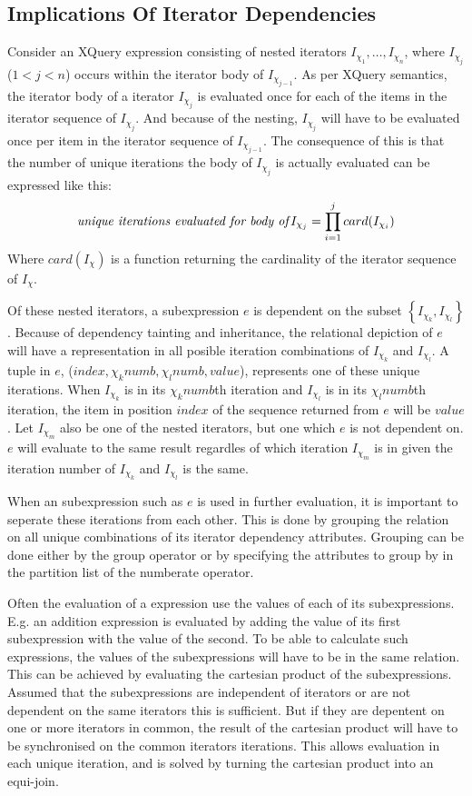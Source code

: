 \subsection{Implications Of Iterator Dependencies}
\label{sect:trans:TD:implic}
Consider an XQuery expression consisting of nested iterators $I_{\chi_1},\ldots,I_{\chi_n}$, where $I_{\chi_j}$
($1<j<n$) occurs within the iterator body of $I_{\chi_{j-1}}$. As per XQuery semantics, the iterator body of a
iterator $I_{\chi_j}$ is evaluated once for each of the items in the iterator sequence of $I_{\chi_j}$. And because
of the nesting, $I_{\chi_j}$ will have to be evaluated once per item in the iterator sequence of $I_{\chi_{j-1}}$.
The consequence of this is that the number of unique iterations the body of $I_{\chi_j}$ is actually evaluated can
be expressed like this: 
\begin{equation*}
\mbox{\textit{unique iterations evaluated for body of}}I_{\chi_j}=\displaystyle \prod_{i=1}^{j}card(I_{\chi_i})
\end{equation*}  
Where $card(I_{\chi})$ is a function returning the cardinality of the iterator sequence of $I_{\chi}$.

Of these nested iterators, a subexpression $e$ is dependent on the subset
$\left\{I_{\chi_k},I_{\chi_l}\right\}$. Because of dependency tainting and inheritance, the relational
depiction of $e$ will have a representation in all posible iteration combinations of $I_{\chi_k}$ and
$I_{\chi_l}$. A tuple in $e$, ($index, \chi_k{numb},\chi_l{numb}, value$), represents one of these unique
iterations. When $I_{\chi_k}$ is in its $\chi_k{numb}$th iteration and $I_{\chi_l}$ is in its $\chi_l{numb}$th
iteration, the item in position $index$ of the sequence returned from $e$ will be $value$. Let $I_{\chi_m}$ also
be one of the nested iterators, but one which $e$ is not dependent on. $e$ will evaluate to the same result
regardles of which iteration $I_{\chi_m}$ is in given the iteration number of $I_{\chi_k}$ and $I_{\chi_l}$ is the
same.

When an subexpression such as $e$ is used in further evaluation, it is important to seperate these iterations from
each other. This is done by grouping the relation on all unique combinations of its iterator dependency attributes.
Grouping can be done either by the \textsf{group} operator or by specifying the attributes to group by in the
partition list of the \textsf{numberate} operator.

Often the evaluation of a expression use the values of each of its subexpressions. E.g. an addition expression is
evaluated by adding the value of its first subexpression with the value of the second. To be able to calculate
such expressions, the values of the subexpressions will have to be in the same relation. This can be achieved by
evaluating the cartesian product of the subexpressions. Assumed that the subexpressions are independent of
iterators or are not dependent on the same iterators this is sufficient. But if they are depentent on one or more
iterators in common, the result of the cartesian product will have to be synchronised on the common iterators
iterations. This allows evaluation in each unique iteration, and is solved by turning the cartesian product into
an equi-join.

